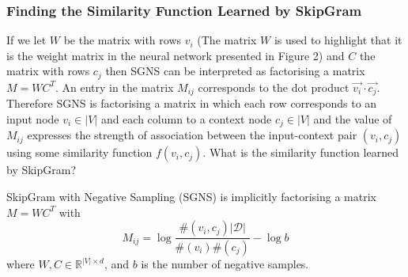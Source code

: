 \documentclass[a4paper]{article}
\begin{document}
\subsubsection{Finding the Similarity Function Learned by SkipGram}
If we let $W$ be the matrix with rows $v_i$ (The matrix $W$ is used to highlight
that it is the weight matrix in the neural network presented in Figure 2) and $C$ the matrix with rows
$c_j$ then SGNS can be interpreted as factorising a matrix $M = WC^T$. An entry in the matrix $M_{ij}$ corresponds to the dot product $\vec{v_i} \cdot
\vec{c_j}$. Therefore SGNS is factorising a matrix in which each row corresponds
to an input node $v_i \in |V|$ and each column to a context node $c_j \in |V|$ and the value of $M_{ij}$ expresses the
strength of association between the input-context pair $(v_i, c_j)$ using some similarity
function $f(v_i,c_j)$. What is the similarity function learned by SkipGram? 
\begin{theorem}
  SkipGram with Negative Sampling (SGNS) is implicitly factorising a matrix $M =
  WC^T$ with
  \[M_{ij} = \log{\frac{\#(v_i,c_j)|\mathcal{D}|}{\#(v_i)\#(c_j)}} - \log{b}\]
  where $W, C \in \mathbb{R}^{|V| \times d}$, and $b$ is the number of negative samples.
\end{theorem}
\end{document}
